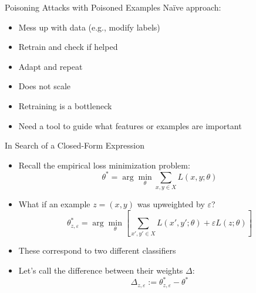 \documentclass[10pt]{beamer}
\begin{document}
\begin{frame}[fragile]{Poisoning Attacks with Poisoned Examples}
  Na\"ive approach:
  \begin{itemize}[<+-| alert@+>]
    \item Mess up with data (e.g., modify labels)
    \item Retrain and check if helped
    \item Adapt and repeat
  \end{itemize}

  \pause

  \begin{itemize}[<+-| alert@+>]
    \item Does not scale
    \item Retraining is a bottleneck
    \item Need a tool to guide what features or examples are important
  \end{itemize}

\end{frame}


\begin{frame}[fragile]{In Search of a Closed-Form Expression}

  \begin{itemize}[<+-| alert@+>]
    \item Recall the empirical loss minimization problem:
      \[
        \theta^* = \arg \min_\theta \sum_{x, y \in X} L(x, y; \theta)
      \]
    \item What if an example $z = (x, y)$ was upweighted by $\varepsilon$?
      \[
        \theta^*_{z, \varepsilon} = \arg \min_\theta \left[\sum_{x', y' \in X} L(x', y'; \theta) +
        \varepsilon L(z; \theta)\right]
      \]
    \item These correspond to two different classifiers
    \item Let's call the difference between their weights $\Delta$:
      \[
        \Delta_{z, \varepsilon} := \theta^*_{z, \varepsilon} - \theta^*
      \]
  \end{itemize}

\end{frame}
\end{document}
